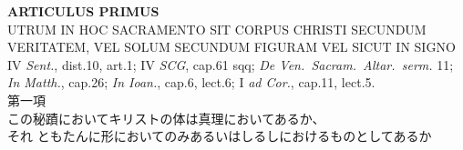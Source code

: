 \documentclass[paper=a4paper,fontsize=10pt,jafontsize=9pt,titlepage]{jlreq}
\begin{document}
\begin{center}
{\Large {\bfseries ARTICULUS PRIMUS}}\\
{\large UTRUM IN HOC SACRAMENTO SIT CORPUS CHRISTI SECUNDUM\\
 VERITATEM, VEL SOLUM SECUNDUM FIGURAM VEL SICUT IN SIGNO}\\
{\footnotesize IV {\itshape Sent.}, dist.10, art.1; IV {\itshape
 SCG}, cap.61 sqq; {\itshape De Ven.~Sacram.~Altar.~serm.} 11;
 {\itshape In Matth.}, cap.26; {\itshape In Ioan.}, cap.6,
 lect.6; I {\itshape ad Cor.}, cap.11, lect.5.}\\
{\Large 第一項\\この秘蹟においてキリストの体は真理においてあるか、\\それ
 ともたんに形においてのみあるいはしるしにおけるものとしてあるか}
\end{center}
\end{document}
